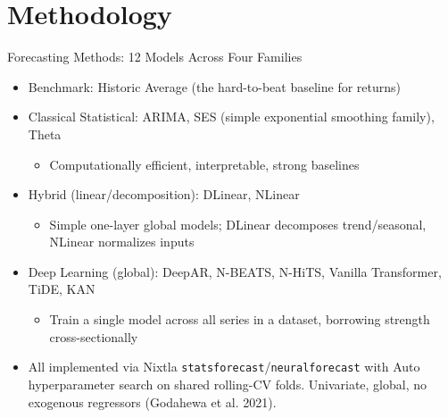 \documentclass[ignorenonframetext, 9pt]{beamer}
\begin{document}
\section{Methodology}

\begin{frame}{Forecasting Methods: 12 Models Across Four Families}
\begin{itemize}
\item \alert{Benchmark:} Historic Average (the hard-to-beat baseline for returns)
\vspace{0.2cm}
\item \alert{Classical Statistical:} ARIMA, SES (simple exponential smoothing family), Theta
\begin{itemize}
  \item Computationally efficient, interpretable, strong baselines
\end{itemize}
\vspace{0.2cm}
\item \alert{Hybrid (linear/decomposition):} DLinear, NLinear
\begin{itemize}
  \item Simple one-layer global models; DLinear decomposes trend/seasonal, NLinear normalizes inputs
\end{itemize}
\vspace{0.2cm}
\item \alert{Deep Learning (global):} DeepAR, N-BEATS, N-HiTS, Vanilla Transformer, TiDE, KAN
\begin{itemize}
  \item Train a \alert{single model across all series} in a dataset, borrowing strength cross-sectionally
\end{itemize}
\vspace{0.25cm}
\item All implemented via Nixtla \texttt{statsforecast}/\texttt{neuralforecast} with \alert{Auto} hyperparameter search on shared rolling-CV folds. \alert{Univariate, global, no exogenous regressors} (Godahewa et al. 2021).
\end{itemize}
\end{frame}
\end{document}
